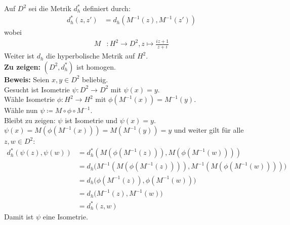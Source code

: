 \begin{problem}[4]
  Auf \( D^2 \) sei die Metrik \( d_h^\ast \) definiert durch:
  \begin{align*}
    d_h^\ast (z, z') &= d_h(M^{-1}(z),M^{-1}(z')) 
  \end{align*}
  wobei
  \begin{align*} 
    M &: H^2 \to D^2, z \mapsto \frac{iz + 1}{z + i}
  \end{align*}
  Weiter ist \( d_h \) die hyperbolische Metrik auf \( H^2 \). \\
  \textbf{Zu zeigen:} \( (D^2, d_h^\ast) \) ist homogen. \\
  \textbf{Beweis:} Seien \( x,y \in D^2 \) beliebig. \\
  Gesucht ist Isometrie \( \psi: D^2 \to D^2 \) mit \( \psi(x) = y \). \\
  Wähle Isometrie \( \phi: H^2 \to H^2 \) mit \( \phi(M^{-1}(x)) = M^{-1}(y) \). \\
  Wähle nun \( \psi \coloneqq M \circ \phi \circ M^{-1} \). \\
  Bleibt zu zeigen: \( \psi \) ist Isometrie und \( \psi(x) = y \). \\
  \( \psi(x) = M(\phi(M^{-1}(x))) = M(M^{-1}(y)) = y \) und weiter gilt für alle \( z, w \in D^2 \):
  \begin{align*}
    d_h^\ast(\psi(z), \psi(w)) &= d_h^\ast (M(\phi(M^{-1}(z))), M(\phi(M^{-1}(w)))) \\
    &= d_h \big(M^{-1}(M(\phi(M^{-1}(z)))), M^{-1}(M(\phi(M^{-1}(w))))\big) \\
    &= d_h \big(\phi(M^{-1}(z)), \phi(M^{-1}(w))\big) \\
    &= d_h \big(M^{-1}(z), M^{-1}(w)) \\
    &= d_h^\ast (z, w)
  \end{align*}
  Damit ist \( \psi \) eine Isometrie.
\end{problem}























